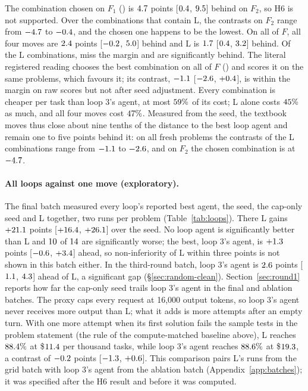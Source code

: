 The combination chosen on $F_1$ (\vHsixWinner) is $4.7$ points [$0.4$, $9.5$] behind
on $F_2$, so H6 is not supported. Over the \vlcN{} combinations that contain L, the contrasts on $F_2$ range from
$-4.7$ to $-0.4$, and the chosen one happens to be the lowest. On all of $F$, all four moves are
$2.4$ points [$-0.2$, $5.0$] behind and L is $1.7$ [$0.4$,
$3.2$] behind. Of the \vlcN{} L combinations, \vlcMiss{} miss the margin and \vlcSig{} are significantly behind.
The literal registered reading chooses the best combination on all of $F$ (\vhsixLitBest) and scores it on the same
problems, which favours it; its contrast, $-1.1$ [$-2.6$, $+0.4$], is within the margin on raw scores
but not after seed adjustment. Every combination is cheaper per task than loop 3's agent, at most
$59\%$ of its cost; L alone costs $45\%$ as much, and all four moves
cost $47\%$. Measured from the seed, the textbook moves thus close about nine tenths of the distance to the
best loop agent and remain one to five points behind it: on all fresh problems the contrasts of the L combinations range
from $-1.1$ to $-2.6$, and on $F_2$ the chosen combination is at $-4.7$.

\paragraph{All loops against one move (exploratory).} The final batch measured every loop's reported best agent, the
seed, the cap-only seed and L together, two runs per problem (Table~\ref{tab:loops}). There L gains $+21.1$ points
[$+16.4$, $+26.1$] over the seed. No loop agent is significantly better than L and $10$ of $14$
are significantly worse; the best, loop 3's agent, is $+1.3$ points [$-0.6$, $+3.4$] ahead, so
non-inferiority of L within three points is not shown in this batch either. In the third-round batch, loop 3's agent is
$2.6$ points [$1.1$, $4.3$] ahead of L, a significant gap
(\S\ref{sec:random-clean}). Section~\ref{sec:round1} reports how far the cap-only seed trails loop 3's agent in the final
and ablation batches. The proxy caps every request at 16{,}000 output tokens, so loop 3's agent never receives more output
than L; what it adds is more attempts after an empty turn. With one more attempt when its first solution fails the
sample tests in the problem statement (the rule of the compute-matched baseline above), L reaches $88.4\%$ at
\$$11.4$ per thousand tasks, while loop 3's agent reaches $88.6\%$ at \$$19.3$, a contrast of
$-0.2$ points [$-1.3$, $+0.6$]. This comparison pairs L's runs from the grid batch with loop 3's agent
from the ablation batch (Appendix~\ref{app:batches}); it was specified after the H6 result and before it was computed.

